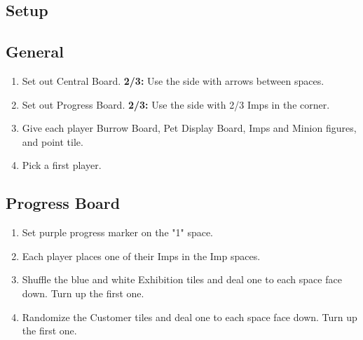 \documentclass[12pt]{article}
\newenvironment{enumerateCustom}
{\begin{enumerate}
  \setlength{\itemsep}{1pt}
  \setlength{\parskip}{0pt}
  \setlength{\parsep}{0pt}}
{\end{enumerate}}
\begin{document}
\begin{mdframed}[style = customFrame]
\begin{multicols*}{2}

\section*{Setup}
\subsection*{General}
\begin{enumerateCustom}
	\item Set out Central Board. \textbf{2/3:} Use the side with arrows between spaces.
	\item Set out Progress Board. \textbf{2/3:} Use the side with 2/3 Imps in the corner.
	\item Give each player Burrow Board, Pet Display Board, Imps and Minion figures, and point tile.
	\item Pick a first player.
\end{enumerateCustom}

\subsection*{Progress Board}
\begin{enumerateCustom}
	\item Set purple progress marker on the "1" space.
	\item Each player places one of their Imps in the Imp spaces.
	\item Shuffle the blue and white Exhibition tiles and deal one to each space face down. Turn up the first one.
	\item Randomize the Customer tiles and deal one to each space face down. Turn up the first one.
\end{enumerateCustom}


\end{multicols*}
\end{mdframed}
\end{document}
